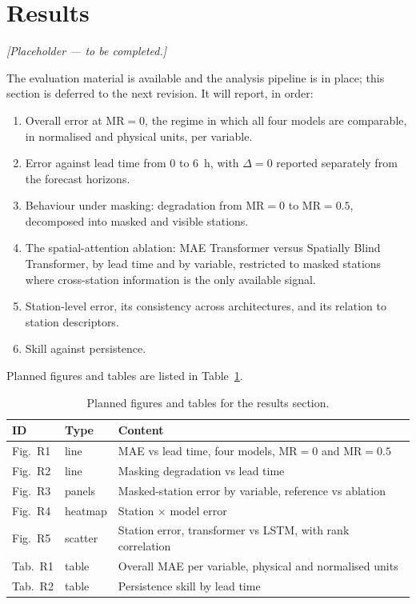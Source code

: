 \section{Results}
\label{sec:results}

\emph{[Placeholder --- to be completed.]}

The evaluation material is available and the analysis pipeline is in place; this
section is deferred to the next revision. It will report, in order:

\begin{enumerate}
  \item Overall error at $\text{MR}=0$, the regime in which all four models are
        comparable, in normalised and physical units, per variable.
  \item Error against lead time from 0 to 6~h, with $\Delta = 0$ reported
        separately from the forecast horizons.
  \item Behaviour under masking: degradation from $\text{MR}=0$ to
        $\text{MR}=0.5$, decomposed into masked and visible stations.
  \item The spatial-attention ablation: MAE Transformer versus Spatially
        Blind Transformer, by lead time and by variable, restricted to
        masked stations where cross-station information is the only
        available signal.
  \item Station-level error, its consistency across architectures, and its
        relation to station descriptors.
  \item Skill against persistence.
\end{enumerate}

Planned figures and tables are listed in Table~\ref{tab:planned-figures}.

\begin{table}[htbp]
\centering
\caption{Planned figures and tables for the results section.}
\label{tab:planned-figures}
\begin{tabular}{lll}
\toprule
ID & Type & Content \\
\midrule
Fig.~R1 & line   & MAE vs lead time, four models, MR$=0$ and MR$=0.5$ \\
Fig.~R2 & line   & Masking degradation vs lead time \\
Fig.~R3 & panels & Masked-station error by variable, reference vs ablation \\
Fig.~R4 & heatmap& Station $\times$ model error \\
Fig.~R5 & scatter& Station error, transformer vs LSTM, with rank correlation \\
Tab.~R1 & table  & Overall MAE per variable, physical and normalised units \\
Tab.~R2 & table  & Persistence skill by lead time \\
\bottomrule
\end{tabular}
\end{table}
